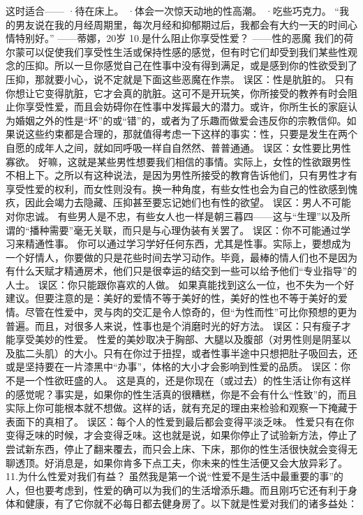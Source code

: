 \documentclass[12pt,UTF8]{ctexbook}
\begin{document}
这时适合——
·待在床上。
·体会一次惊天动地的性高潮。
·吃些巧克力。
“我的男友说在我的月经周期里，每次月经和抑郁期过后，我都会有大约一天的时间心情特别好。”
——蒂娜，20岁
10.是什么阻止你享受性爱？
——性的恶魔
我们的荷尔蒙可以促使我们享受性生活或保持性感的感觉，但有时它们却受到我们某些性观念的压抑。所以一旦你感觉自己在性事中没有得到满足，或是感到你的性欲受到了压抑，那就要小心，说不定就是下面这些恶魔在作祟。
误区：性是肮脏的。
只有你想让它变得肮脏，它才会真的肮脏。这可不是开玩笑，你所接受的教养有时会阻止你享受性爱，而且会妨碍你在性事中发挥最大的潜力。或许，你所生长的家庭认为婚姻之外的性是“坏”的或“错”的，或者为了乐趣而做爱会违反你的宗教信仰。如果说这些约束都是合理的，那就值得考虑一下这样的事实：性，只要是发生在两个自愿的成年人之间，就如同呼吸一样自自然然、普普通通。
误区：女性要比男性寡欲。
好嘛，这就是某些男性想要我们相信的事情。实际上，女性的性欲跟男性不相上下。之所以有这种说法，是因为男性所接受的教育告诉他们，只有男性才有享受性爱的权利，而女性则没有。换一种角度，有些女性也会为自己的性欲感到愧疚，因此会竭力去隐藏、压抑甚至要忘记她们也有性的欲望。
误区：男人不可能对你忠诚。
有些男人是不忠，有些女人也一样是朝三暮四——这与“生理”以及所谓的“播种需要”毫无关联，而只是与心理伪装有关罢了。
误区：你不可能通过学习来精通性事。
你可以通过学习学好任何东西，尤其是性事。实际上，要想成为一个好情人，你要做的只是花些时间去学习动作。毕竟，最棒的情人们也不是因为有什么天赋才精通房术，他们只是很幸运的结交到一些可以给予他们“专业指导”的人士。
误区：你只能跟你喜欢的人做。
如果真能找到这么一位，也不失为一个好建议。但要注意的是：美好的爱情不等于美好的性，美好的性也不等于美好的爱情。尽管在性爱中，灵与肉的交汇是令人惊奇的，但“为性而性”可比你预想的更为普遍。而且，对很多人来说，性事也是个消磨时光的好方法。
误区：只有瘦子才能享受美妙的性爱。
性爱的美妙取决于胸部、大腿以及腹部（对男性则是阴茎以及肱二头肌）的大小。只有在你过于扭捏，或者性事半途中只想把肚子吸回去，还或是坚持要在一片漆黑中“办事”，体格的大小才会影响到性爱的品质。
误区：你不是一个性欲旺盛的人。
这是真的，还是你现在（或过去）的性生活让你有这样的感觉呢？事实是，如果你的性生活真的很糟糕，你是不会有什么“性致”的，而且实际上你可能根本就不想做。这样的话，就有充足的理由来检验和观察一下掩藏于表面下的真相了。
误区：每个人的性爱到最后都会变得平淡乏味。
性爱只有在你变得乏味的时候，才会变得乏味。这也就是说，如果你停止了试验新方法，停止了尝试新东西，停止了翻来覆去，而只会上床、下床，那你的性生活很快就会变得无聊透顶。好消息是，如果你肯多下点工夫，你未来的性生活便又会大放异彩了。
11.为什么性爱对我们有益？
虽然我是第一个说“性爱不是生活中最重要的事”的人，但也要考虑到，性爱的确可以为我们的生活增添乐趣。而且刚巧它还有利于身体和健康，有了它你就不必每日都去健身房了。以下就是性爱对我们的诸多益处：
\end{document}
